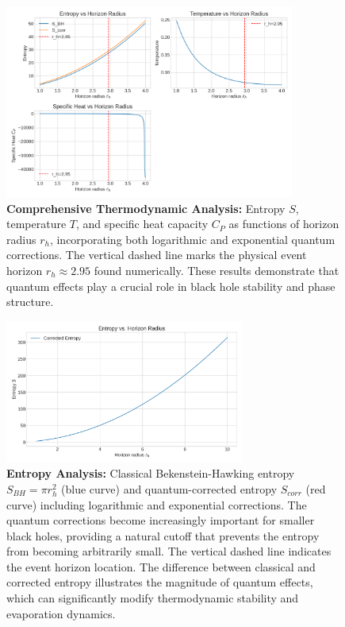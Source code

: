 \documentclass[superscriptaddress, prd, aps,amsmath,amssymb,showpacs,showkeys, onecolumn]{revtex4-2}
\begin{document}
\begin{figure}[H]
    \centering
    \includegraphics[width=0.85\textwidth]{figures/figure_3.png}
    \caption{\textbf{Comprehensive Thermodynamic Analysis:} Entropy $S$, temperature $T$, and specific heat capacity $C_P$ as functions of horizon radius $r_h$, incorporating both logarithmic and exponential quantum corrections. The vertical dashed line marks the physical event horizon $r_h \approx 2.95$ found numerically. These results demonstrate that quantum effects play a crucial role in black hole stability and phase structure.}
    \label{fig:notebook_fig3}
\end{figure}

\begin{figure}[H]
    \centering
    \includegraphics[width=0.7\textwidth]{figures/entropy_vs_rh.png}
    \caption{\textbf{Entropy Analysis:} Classical Bekenstein-Hawking entropy $S_{BH} = \pi r_h^2$ (blue curve) and quantum-corrected entropy $S_{corr}$ (red curve) including logarithmic and exponential corrections. The quantum corrections become increasingly important for smaller black holes, providing a natural cutoff that prevents the entropy from becoming arbitrarily small. The vertical dashed line indicates the event horizon location. The difference between classical and corrected entropy illustrates the magnitude of quantum effects, which can significantly modify thermodynamic stability and evaporation dynamics.}
    \label{fig:entropy_vs_rh}
\end{figure}
\end{document}
